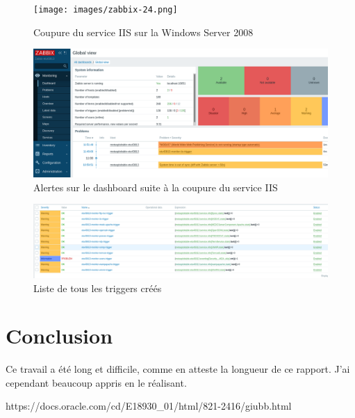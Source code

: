 \documentclass[a4paper]{article}
\begin{document}
\begin{figure}[H]
    \centering
    \texttt{[image: images/zabbix-24.png]}
    \caption{Coupure du service IIS sur la Windows Server 2008}
    \label{fig:zabbix24}
\end{figure}
\begin{figure}[H]
    \centering
    \includegraphics[width=0.95\linewidth]{images/zabbix-25.png}
    \caption{Alertes sur le dashboard suite à la coupure du service IIS}
    \label{fig:zabbix25}
\end{figure}
\begin{figure}[H]
    \centering
    \includegraphics[width=0.99\linewidth]{images/zabbix-58.png}
    \caption{Liste de tous les triggers créés}
    \label{fig:zabbix58}
\end{figure}















\section{Conclusion}





Ce travail a été long et difficile, comme en atteste la longueur de ce rapport. J'ai cependant beaucoup appris en le réalisant.




















\newpage \tableofcontents \listoffigures
\begin{thebibliography}{9}
 https://docs.oracle.com/cd/E18930\_01/html/821-2416/giubb.html
\end{thebibliography}
\end{document}
